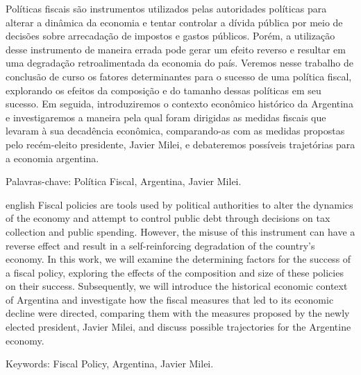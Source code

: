 \documentclass[a4paper, 12pt, openany, oneside, brazil]{abntex2}
\begin{document}
	\setlength{\absparsep}{18pt} %
	\begin{resumo}
	Políticas fiscais são instrumentos utilizados pelas autoridades políticas para alterar a dinâmica da economia e tentar controlar a dívida pública por meio de decisões sobre arrecadação de impostos e gastos públicos. Porém, a utilização desse instrumento de maneira errada pode gerar um efeito reverso e resultar em uma degradação retroalimentada da economia do país. Veremos nesse trabalho de conclusão de curso os fatores determinantes para o sucesso de uma política fiscal, explorando os efeitos da composição e do tamanho dessas políticas em seu sucesso. Em seguida, introduziremos o contexto econômico histórico da Argentina e investigaremos a maneira pela qual foram dirigidas as medidas fiscais que levaram à sua decadência econômica, comparando-as com as medidas propostas pelo recém-eleito presidente, Javier Milei, e debateremos possíveis trajetórias para a economia argentina. 

	Palavras-chave: Política Fiscal, Argentina, Javier Milei.
	\end{resumo}

	\begin{resumo}[Abstract]
	 \begin{otherlanguage*}{english}
	Fiscal policies are tools used by political authorities to alter the dynamics of the economy and attempt to control public debt through decisions on tax collection and public spending. However, the misuse of this instrument can have a reverse effect and result in a self-reinforcing degradation of the country's economy. In this work, we will examine the determining factors for the success of a fiscal policy, exploring the effects of the composition and size of these policies on their success. Subsequently, we will introduce the historical economic context of Argentina and investigate how the fiscal measures that led to its economic decline were directed, comparing them with the measures proposed by the newly elected president, Javier Milei, and discuss possible trajectories for the Argentine economy.


Keywords: Fiscal Policy, Argentina, Javier Milei.
 \end{otherlanguage*}
\end{resumo}


\tableofcontents*
\cleardoublepage
\end{document}
